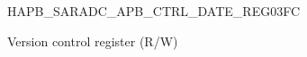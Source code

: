 \begin{register}{H}{APB\_SARADC\_APB\_CTRL\_DATE\_REG}{\hexprefix{}03FC}\label{regdesc:APBSARADCAPBCTRLDATEREG}
%
\regnewline%
\begin{regdesc}\begin{reglist}
\label{fielddesc:APBSARADCAPBCTRLDATE}\item [APB\_SARADC\_APB\_CTRL\_DATE] Version control register (R/W)
\end{reglist}\end{regdesc}
\end{register}
